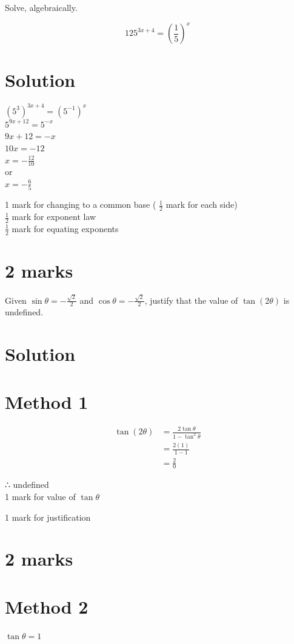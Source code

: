 \documentclass[10pt]{article}
\begin{document}
Solve, algebraically.

$$
125^{3 x+4}=\left(\frac{1}{5}\right)^{x}
$$

\section*{Solution}
$\left(5^{3}\right)^{3 x+4}=\left(5^{-1}\right)^{x}$\\
$5^{9 x+12}=5^{-x}$\\
$9 x+12=-x$\\
$10 x=-12$\\
$x=-\frac{12}{10}$\\
or\\
$x=-\frac{6}{5}$

1 mark for changing to a common base ( $\frac{1}{2}$ mark for each side)\\
$\frac{1}{2}$ mark for exponent law\\
$\frac{1}{2}$ mark for equating exponents

\section*{2 marks}
Given $\sin \theta=-\frac{\sqrt{2}}{2}$ and $\cos \theta=-\frac{\sqrt{2}}{2}$, justify that the value of $\tan (2 \theta)$ is undefined.

\section*{Solution}
\section*{Method 1}
$$
\begin{aligned}
\tan (2 \theta) & =\frac{2 \tan \theta}{1-\tan ^{2} \theta} \\
& =\frac{2(1)}{1-1} \\
& =\frac{2}{0}
\end{aligned}
$$

∴ undefined\\
1 mark for value of $\tan \theta$

1 mark for justification

\section*{2 marks}
\section*{Method 2}
$\tan \theta=1$
\end{document}
